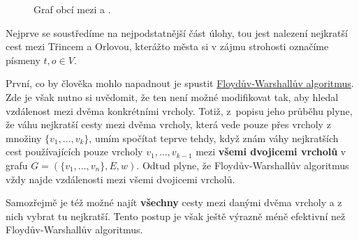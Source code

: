 \begin{figure}[h]
 \caption{Graf obcí mezi  a .}
 \label{fig:trinec-orlova}
\end{figure}

Nejprve se soustředíme na nejpodstatnější část úlohy, tou jest nalezení
nejkratší cest mezi Třincem a Orlovou, kterážto města si v zájmu strohosti
označíme písmeny $t,o \in V$.

První, co by člověka mohlo napadnout je spustit
\hyperref[alg:floyd-warshall]{Floydův-Warshallův algoritmus}. Zde je však nutno
si uvědomit, že ten není možné modifikovat tak, aby hledal vzdálenost mezi dvěma
konkrétními vrcholy. Totiž, z~popisu jeho průběhu plyne, že váhu nejkratší cesty
mezi dvěma vrcholy, která vede pouze přes vrcholy z množiny
$\{v_1,\ldots,v_k\}$, umím spočítat teprve tehdy, když znám váhy nejkratších
cest používajících pouze vrcholy $v_1,\ldots,v_{k-1}$ mezi \textbf{všemi
dvojicemi vrcholů} v grafu $G = (\{v_1,\ldots,v_n\}, E, w)$. Odtud plyne, že
Floydův-Warshallův algoritmus vždy najde vzdálenosti mezi všemi dvojicemi
vrcholů.

Samozřejmě je též možné najít \textbf{všechny} cesty mezi danými dvěma vrcholy a
z nich vybrat tu nejkratší. Tento postup je však ještě výrazně méně efektivní
než Floydův-Warshallův algoritmus.

